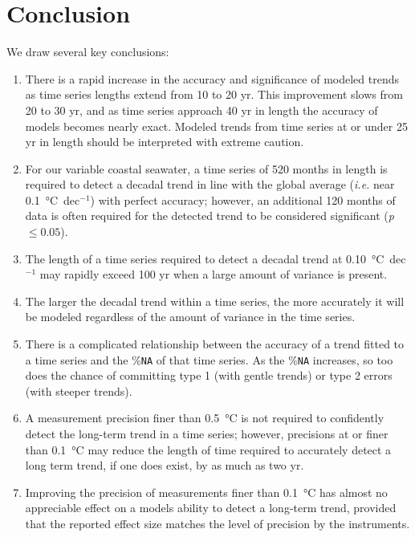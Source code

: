 \documentclass[twocol]{ametsoc}
\begin{document}
\section{Conclusion}
We draw several key conclusions:

\begin{enumerate}
\item There is a rapid increase in the accuracy and significance of modeled trends as time series lengths extend from 10 to 20 yr. This improvement slows from 20 to 30 yr, and as time series approach 40 yr in length the accuracy of models becomes nearly exact. Modeled trends from time series at or under 25 yr in length should be interpreted with extreme caution.

\item For our variable coastal seawater, a time series of 520 months in length is required to detect a decadal trend in line with the global average (\emph{i.e.} near \SI{0.1}{\degreeCelsius}~dec$^{-1}$) with perfect accuracy; however, an additional 120 months of data is often required for the detected trend to be considered significant (\emph{p} $\leq 0.05$).

\item The length of a time series required to detect a decadal trend at \SI{0.10}{\degreeCelsius}~dec$^{-1}$ may rapidly exceed 100 yr when a large amount of variance is present.

\item The larger the decadal trend within a time series, the more accurately it will be modeled regardless of the amount of variance in the time series.

\item There is a complicated relationship between the accuracy of a trend fitted to a time series and the \%\texttt{NA} of that time series. As the \%\texttt{NA} increases, so too does the chance of committing type 1 (with gentle trends) or type 2 errors (with steeper trends).

\item A measurement precision finer than \SI{0.5}{\degreeCelsius} is not required to confidently detect the long-term trend in a time series; however, precisions at or finer than \SI{0.1}{\degreeCelsius} may reduce the length of time required to accurately detect a long term trend, if one does exist, by as much as two yr.

\item Improving the precision of measurements finer than \SI{0.1}{\degreeCelsius} has almost no appreciable effect on a models ability to detect a long-term trend, provided that the reported effect size matches the level of precision by the instruments.
\end{enumerate}
\end{document}
